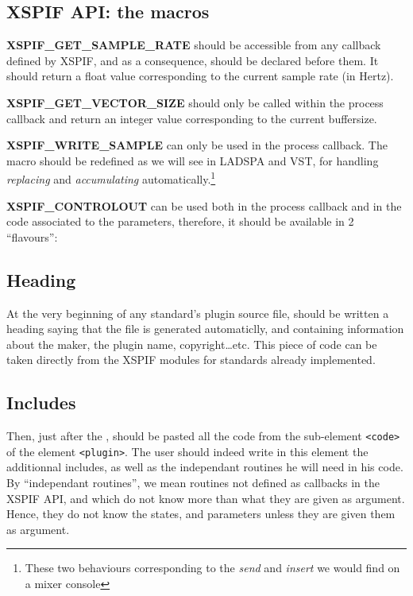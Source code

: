 \subsection{XSPIF API: the macros}

\begin{description}
\item \textbf{XSPIF\_GET\_SAMPLE\_RATE} should be accessible from any
  callback  defined by XSPIF, and as a consequence, should be declared
  before them. It should return a float value corresponding to the
  current sample rate (in Hertz). 
\item \textbf{XSPIF\_GET\_VECTOR\_SIZE} should only be called within 
  the process callback and return an integer value corresponding to
  the current buffersize. 
\item \textbf{XSPIF\_WRITE\_SAMPLE} can only be used in the process
  callback. The macro should be redefined as we will see in LADSPA and
  VST, for handling \textit{replacing} and \textit{accumulating}
  automatically.\footnote{These two behaviours corresponding to the \emph{send}
  and \emph{insert} we would find on a mixer console}  
\item \textbf{XSPIF\_CONTROLOUT}  can be used both in the process
  callback and in the code associated to the parameters, therefore, it
  should be available in 2 ``flavours'': 
\end{description}

\subsection{Heading}
\noindent At the very beginning of any standard's plugin source file, should be written a heading saying that the file is generated automaticlly, and containing information about the maker, the plugin name, copyright\ldots etc. This piece of code can be taken directly from the XSPIF modules for standards already implemented.\\

\subsection{Includes}
\noindent Then, just after the , should be pasted all the code from the sub-element \verb|<code>| of the element \verb|<plugin>|. The user should indeed write in this element the additionnal includes, as well as the independant routines he will need in his code.\\
\noindent By ``independant routines'', we mean routines not defined as callbacks in the XSPIF API, and which do not know more than what they are given as argument. Hence, they do not know the states, and parameters unless they are given them as argument.\\



